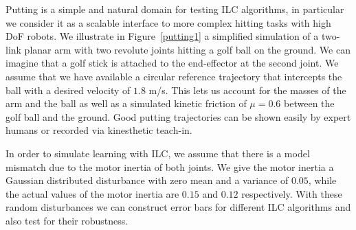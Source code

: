 Putting is a simple and natural domain for testing ILC algorithms, in particular we consider it as a scalable interface to more complex hitting tasks with high DoF robots. We illustrate in Figure~\ref{putting1} a simplified simulation of a two-link planar arm with two revolute joints hitting a golf ball on the ground. We can imagine that a golf stick is attached to the end-effector at the second joint. We assume that we have available a circular reference trajectory that intercepts the ball with a desired velocity of $1.8$ m/s. This lets us account for the masses of the arm and the ball as well as a simulated kinetic friction of $\mu = 0.6$ between the golf ball and the ground. Good putting trajectories can be shown easily by expert humans or recorded via kinesthetic teach-in. 

In order to simulate learning with ILC, we assume that there is a model mismatch due to the motor inertia of both joints. We give the motor inertia a Gaussian distributed disturbance with zero mean and a variance of $0.05$, while the actual values of the motor inertia are $0.15$ and $0.12$ respectively. With these random disturbances we can construct error bars for different ILC algorithms and also test for their robustness.

